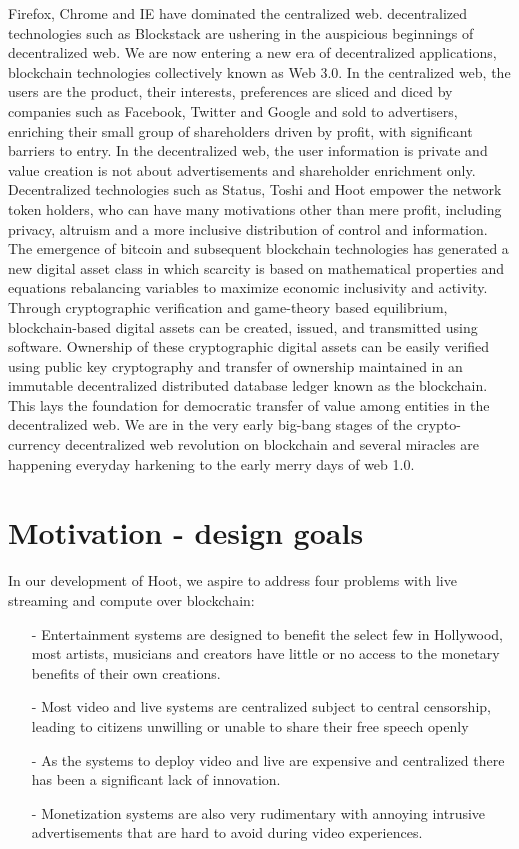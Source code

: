 \documentclass{article}
\begin{document}
 Firefox, Chrome and IE have dominated the centralized web. decentralized technologies such as Blockstack are ushering in the auspicious beginnings of decentralized web. 
 We are now entering a new era of decentralized applications, blockchain technologies collectively known as Web 3.0. In the centralized web, the users are the product, their interests, preferences are sliced and diced by companies such as Facebook, Twitter and Google and sold to advertisers, enriching their small group of shareholders driven by profit, with significant barriers to entry. In the
decentralized web, the user information is private and value creation is not about advertisements and shareholder enrichment only. Decentralized
technologies such as Status, Toshi and Hoot empower the network token holders, who can have many motivations other than mere profit, including privacy, altruism and a more inclusive distribution of control and information. The emergence of bitcoin and subsequent blockchain technologies has generated a new digital asset class in which scarcity is based on mathematical properties and equations rebalancing variables to maximize economic inclusivity and activity. Through cryptographic verification and game-theory based equilibrium, blockchain-based digital assets can be created, issued, and transmitted using software. Ownership of these cryptographic digital assets can be easily verified using public key cryptography and transfer of ownership maintained in an immutable decentralized distributed database ledger known as the blockchain. This lays the foundation for democratic transfer of value among entities in the decentralized web.
 We are in the very early big-bang stages of the crypto-currency decentralized web revolution on blockchain and several miracles are happening everyday harkening to the early merry days of web 1.0.

\section{Motivation - design goals}
In our development of Hoot, we aspire to address four problems with live streaming and compute over blockchain:
\begin{itemize}
\item[-]Entertainment systems are designed to benefit the select few in Hollywood, most artists, musicians and creators have little or no access to the monetary benefits of their own creations.
\item[-]Most video and live systems are centralized subject to central censorship, leading to citizens unwilling or unable to share their free speech openly
\item[-]As the systems to deploy video and live are expensive and centralized there has been a significant lack of innovation.
\item[-]Monetization systems are also very rudimentary with annoying intrusive advertisements that are hard to avoid during video experiences. 
\end{itemize}
\end{document}
